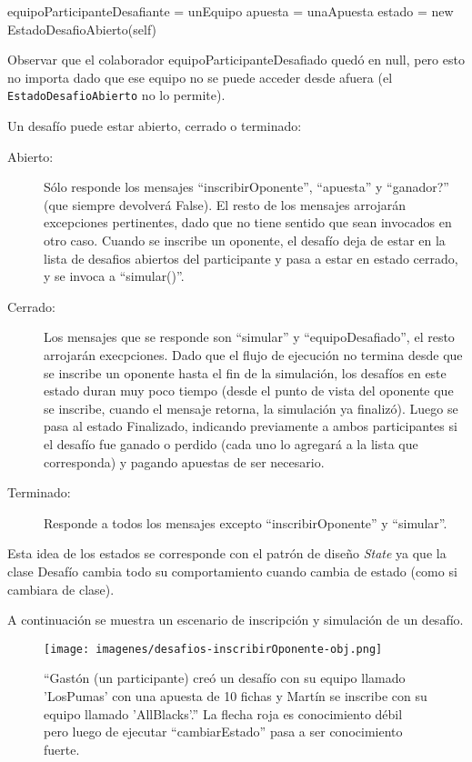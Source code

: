 \begin{algorithmic}
	  \State equipoParticipanteDesafiante = unEquipo
	  \State apuesta = unaApuesta
	  \State estado = new EstadoDesafioAbierto(self)
	\EndFunction
\end{algorithmic}

Observar que el colaborador equipoParticipanteDesafiado quedó en null, pero esto no importa dado que ese equipo no se puede acceder desde
afuera (el {\tt EstadoDesafioAbierto} no lo permite).

Un desafío puede estar abierto, cerrado o terminado:
\begin{description}
 \item[Abierto:] Sólo responde los mensajes ``inscribirOponente'', ``apuesta'' y ``ganador?'' (que siempre devolverá False). El resto de los mensajes
 arrojarán excepciones pertinentes, dado que no tiene sentido que sean invocados en otro caso. Cuando se inscribe un oponente, el desafío deja de estar
 en la lista de desafios abiertos del participante y pasa a estar en estado cerrado, y se invoca a ``simular()''.
 \item[Cerrado:] Los mensajes que se responde son ``simular'' y ``equipoDesafiado'', el resto arrojarán execpciones. Dado que el flujo de ejecución no termina
 desde que se inscribe un oponente hasta el fin de la simulación, los desafíos en este estado duran muy poco tiempo (desde el punto de vista del oponente
 que se inscribe, cuando el mensaje retorna, la simulación ya finalizó). Luego se pasa al estado Finalizado, indicando previamente a ambos participantes
 si el desafío fue ganado o perdido (cada uno lo agregará a la lista que corresponda) y pagando apuestas de ser necesario.
 \item[Terminado:] Responde a todos los mensajes excepto ``inscribirOponente'' y ``simular''.
\end{description}

Esta idea de los estados se corresponde con el patrón de diseño \emph{State} ya que la clase Desafío cambia todo su comportamiento cuando
cambia de estado (como si cambiara de clase).

A continuación se muestra un escenario de inscripción y simulación de un desafío.

  \begin{figure}[h!]
   \texttt{[image: imagenes/desafios-inscribirOponente-obj.png]}
   
   \caption{``Gastón (un participante) creó un desafío con su equipo llamado 'LosPumas' con una apuesta de 10 fichas y Martín se inscribe con su equipo llamado 
'AllBlacks'.'' La flecha roja es conocimiento débil pero luego de ejecutar ``cambiarEstado'' pasa a ser conocimiento fuerte.}
  \end{figure}
  
